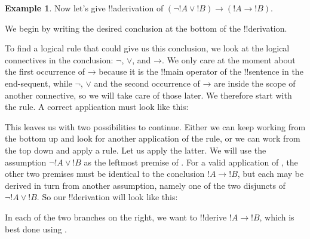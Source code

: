 \documentclass[10pt,a4paper]{article}
\theoremstyle{plain}
\theoremstyle{definition}
\newtheorem{ex}[thm]{Example}
\theoremstyle{remark}
\providecommand{\AxiomC}[1]{}
\providecommand{\UnaryInfC}[1]{}
\providecommand{\TrinaryInfC}[1]{}
\newenvironment{prooftree}{}{}
\providecommand{\lif}{\mathbin{\rightarrow}}
\providecommand{\Elim}[1]{}
\providecommand{\Intro}[1]{}
\providecommand{\Discharge}{\mathrm{Dis}}
\providecommand{\Intro}{\mathrm{I}}
\begin{document}
\begin{ex}
Now let's give !!a{derivation} of $(\lnot !A \lor !B)
\lif (!A \lif !B)$.

We begin by writing the desired conclusion at the bottom of the 
!!{derivation}.
\begin{prooftree}
\AxiomC{}
\UnaryInfC{$(\lnot !A \lor !B) \lif (!A \lif !B)$}
\end{prooftree}
To find a logical rule that could give us this conclusion, we
look at the logical connectives in the conclusion: $\lnot$,
$\lor$, and $\lif$. We only care at the moment about the first
occurrence of $\lif$ because it is the !!{main operator} of the
!!{sentence} in the end-sequent, while $\lnot$, $\lor$ and the second
occurrence of $\lif$ are inside the scope of another connective, so we
will take care of those later. We therefore start with the
\Intro{\lif} rule.  A correct application must look like this:
\begin{prooftree}
\AxiomC{$\Discharge{\lnot !A \lor !B}{1}$}
\DeduceC{$!A \lif !B$}
\DischargeRule{\Intro{\lif}}{1}
\UnaryInfC{$(\lnot !A \lor !B) \lif (!A \lif !B)$}
\end{prooftree}
This leaves us with two possibilities to continue. Either we can
keep working from the bottom up and look for another application
of the \Intro{\lif} rule, or we can work from the top down and apply a
\Elim{\lor} rule. Let us apply the latter. We will use the assumption
$\lnot !A \lor !B$ as the leftmost premise of \Elim{\lor}.  For a valid
application of \Elim{\lor}, the other two premises must be identical
to the conclusion $!A \lif !B$, but each may be derived in turn from
another assumption, namely one of the two disjuncts of $\lnot !A \lor !B$.
So our !!{derivation} will look like this:
\begin{prooftree}
\AxiomC{$\Discharge{\lnot !A \lor !B}{1}$}
\AxiomC{$\Discharge{\lnot !A}{2}$}
\DeduceC{$!A \lif !B$}
\AxiomC{$\Discharge{!B}{2}$}
\DeduceC{$!A \lif !B$}
\DischargeRule{\Elim{\lor}}{2}
\TrinaryInfC{$!A \lif !B$}
\DischargeRule{\Intro{\lif}}{1} 
\UnaryInfC{$(\lnot !A \lor !B) \lif (!A \lif !B)$}
\end{prooftree}

In each of the two branches on the right, we want to !!{derive} $!A
\lif !B$, which is best done using \Intro{\lif}.
\begin{prooftree}
\AxiomC{$\Discharge{\lnot !A \lor !B}{1}$}
\AxiomC{$\Discharge{\lnot !A}{2}, \Discharge{!A}{3}$}
\DischargeRule{\Intro{\lif}}{3}
\UnaryInfC{$!A \lif !B$}
\AxiomC{$\Discharge{!B}{2}, \Discharge{!A}{4}$}
\DischargeRule{\Intro{\lif}}{4}
\UnaryInfC{$!A \lif !B$}
\DischargeRule{\Elim{\lor}}{2}
\TrinaryInfC{$!A \lif !B$}
\DischargeRule{\Intro{\lif}}{1} 
\UnaryInfC{$(\lnot !A \lor !B) \lif (!A \lif !B)$}
\end{prooftree}


\end{ex}
\end{document}
